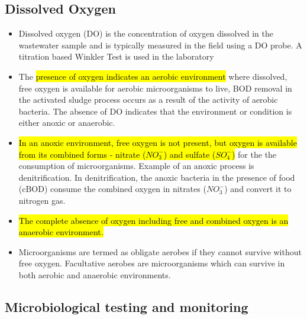 \subsection{Dissolved Oxygen}	
			\begin{itemize}
				\item Dissolved oxygen (DO) is the concentration of oxygen dissolved in the wastewater sample and is typically measured in the field using a DO probe.  A titration based Winkler Test is used in the laboratory
				\item The \hl{presence of oxygen indicates an aerobic environment} where dissolved, free oxygen is available for aerobic microorganisms to live, BOD removal in the activated sludge process occurs as a result of the activity of aerobic bacteria.  The absence of DO indicates that the environment or condition is either anoxic or anaerobic.  
				\item \hl{In an anoxic environment, free oxygen is not present, but oxygen is available from its combined  forms - nitrate ($NO_3^-$) and sulfate ($SO_4^-$)} for the the consumption of microorganisms.  Example of an anoxic process is denitrification.  In denitrification, the anoxic bacteria in the presence of food (cBOD) consume the combined oxygen in nitrates ($NO_3^-$) and convert it to nitrogen gas.
				\item \hl{The complete absence of oxygen including free and combined oxygen is an anaerobic environment.}
				\item Microorganisms are termed as obligate aerobes if they cannot survive without free oxygen.  Facultative aerobes are microorganisms which can survive in both aerobic and anaerobic environments.  
			\end{itemize}
			
\subsection{Microbiological testing and monitoring}	
